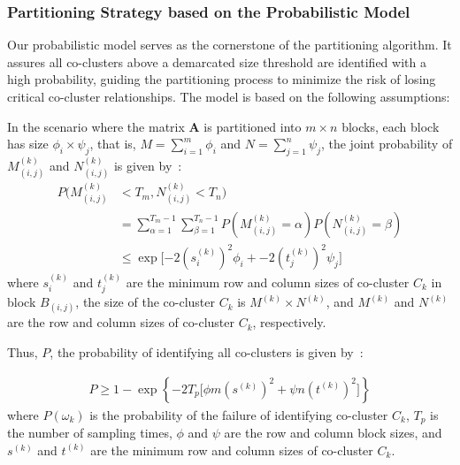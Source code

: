 \documentclass[journal]{IEEEtran}
\theoremstyle{definition}
\theoremstyle{remark} %
\begin{document}
\subsubsection{Partitioning Strategy based on the Probabilistic Model}

Our probabilistic model serves as the cornerstone of the partitioning algorithm. It assures all co-clusters above a demarcated size threshold are identified with a high probability, guiding the partitioning process to minimize the risk of losing critical co-cluster relationships. The model is based on the following assumptions:

In the scenario where the matrix $\mathbf{A}$ is partitioned into $m \times n$ blocks, each block has size $\phi_i \times \psi_j$, that is, $M=\sum_{i=1}^m \phi_i$ and $N=\sum_{j=1}^n \psi_j$, the joint probability of $M_{(i,j)}^{(k)}$ and $N_{(i,j)}^{(k)}$ is given by~:
\begin{equation}
    \begin{split}
        P(M_{(i,j)}^{(k)} & < T_m, N_{(i,j)}^{(k)} < T_n)                                                                           \\
                          & = \sum_{\alpha=1}^{T_m-1} \sum_{\beta=1}^{T_n-1} P(M_{(i,j)}^{(k)} = \alpha) P(N_{(i,j)}^{(k)} = \beta) \\
                          & \le \exp[-2 (s_i^{(k)})^2 \phi_i + -2 (t_j^{(k)})^2 \psi_j\rbrack
    \end{split}
\end{equation}
where $s_i^{(k)}$ and $t_j^{(k)}$ are the minimum row and column sizes of co-cluster $C_k$ in block $B_{(i,j)}$, the size of the co-cluster $C_k$ is $M^{(k)} \times N^{(k)}$, and $M^{(k)}$ and $N^{(k)}$ are the row and column sizes of co-cluster $C_k$, respectively.

Thus, $P$, the probability of identifying all co-clusters is given by~:

\begin{equation}
    \begin{split}
        P \ge 1 - \exp \left\{ -2 T_p \lbrack \phi m (s^{(k)})^2 + \psi n (t^{(k)})^2\rbrack  \right\} \label{eq:prob-of-identifying-all-co-clusters-sec}
    \end{split}
\end{equation}
where $P(\omega_k)$ is the probability of the failure of identifying co-cluster $C_k$, $T_p$ is the number of sampling times, $\phi$ and $\psi$ are the row and column block sizes, and $s^{(k)}$ and $t^{(k)}$ are the minimum row and column sizes of co-cluster $C_k$.
\end{document}

